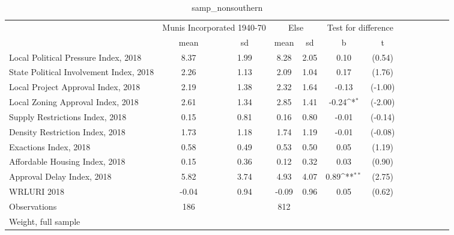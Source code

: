 \begin{table}[htbp]\centering
\def\sym#1{\ifmmode^{#1}\else\(^{#1}\)\fi}
\caption{samp\_nonsouthern \label{tab1}}
\begin{tabular}{l*{3}{cccc}}
\toprule
                    &\multicolumn{2}{c}{Munis Incorporated 1940-70}&\multicolumn{2}{c}{Else} &\multicolumn{2}{c}{Test for difference}\\
                    &        mean&          sd&        mean&          sd&           b         &           t\\
\midrule
Local Political Pressure Index, 2018&        8.37&        1.99&        8.28&        2.05&        0.10         &      (0.54)\\
State Political Involvement Index, 2018&        2.26&        1.13&        2.09&        1.04&        0.17         &      (1.76)\\
Local Project Approval Index, 2018&        2.19&        1.38&        2.32&        1.64&       -0.13         &     (-1.00)\\
Local Zoning Approval Index, 2018&        2.61&        1.34&        2.85&        1.41&       -0.24\sym{*}  &     (-2.00)\\
Supply Restrictions Index, 2018&        0.15&        0.81&        0.16&        0.80&       -0.01         &     (-0.14)\\
Density Restriction Index, 2018&        1.73&        1.18&        1.74&        1.19&       -0.01         &     (-0.08)\\
Exactions Index, 2018&        0.58&        0.49&        0.53&        0.50&        0.05         &      (1.19)\\
Affordable Housing Index, 2018&        0.15&        0.36&        0.12&        0.32&        0.03         &      (0.90)\\
Approval Delay Index, 2018&        5.82&        3.74&        4.93&        4.07&        0.89\sym{**} &      (2.75)\\
WRLURI 2018         &       -0.04&        0.94&       -0.09&        0.96&        0.05         &      (0.62)\\
\midrule
Observations        &         186&            &         812&            &                     &            \\
\bottomrule
\multicolumn{7}{l}{\footnotesize Weight, full sample}\\
\end{tabular}
\end{table}
